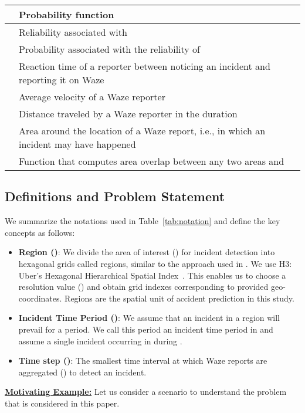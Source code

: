 \documentclass[conference]{IEEEtran}
\begin{document}
\begin{table}[h]
\begin{tabular}{|p{1cm}|p{6.5cm}|}
    \hline
     & Probability function\\
    \hline
     & Reliability associated with \\
    \hline
     & Probability associated with the reliability of \\
    \hline
     & Reaction time of a reporter between noticing an incident and reporting it on Waze\\
    \hline
     & Average velocity of a Waze reporter\\
    \hline
     & Distance traveled by a Waze reporter in the duration \\
    \hline
     & Area around the location of a Waze report, i.e.,  in which an incident may have happened\\
    \hline
     & Function that computes area overlap between any two areas  and \\
    \hline
    
    \end{tabular}
\end{table}

\subsection{Definitions and Problem Statement} \label{subsec:def}
We summarize the notations used in Table~\ref{tab:notation} and define the key concepts as follows: 
\begin{itemize}[leftmargin=*]
    \item \textbf{Region ()}: We divide the area of interest () for incident detection into hexagonal grids called regions, similar to the approach used in \cite{mukhopadhyay2019online}. We use H3: Uber’s Hexagonal Hierarchical Spatial Index~\cite{uber_h3_2020}. This enables us to choose a resolution value () and obtain grid indexes corresponding to provided geo-coordinates. Regions are the spatial unit of accident prediction in this study.
    \item \textbf{Incident Time Period ()}: We assume that an incident in a region  will prevail for a  period. We call this period an incident time period in  and assume a single incident occurring in  during .  
    \item \textbf{Time step ()}: The smallest time interval at which Waze reports are aggregated () to detect an incident. \end{itemize}


\textbf{\underline{Motivating Example:}} Let us consider a  scenario to understand the problem that is considered in this paper.
\end{document}
